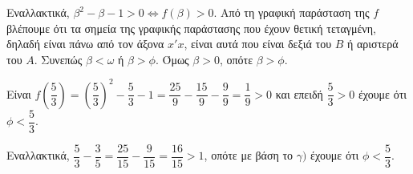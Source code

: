 \begin{alist}
Εναλλακτικά, $\beta^2 - \beta - 1 > 0 \Leftrightarrow f(\beta) > 0$. Από τη γραφική παράσταση της $f$
βλέπουμε ότι τα σημεία της γραφικής παράστασης που έχουν θετική τεταγμένη,
δηλαδή είναι πάνω από τον άξονα $x'x$, είναι αυτά που είναι δεξιά του $B$ ή αριστερά
του $A$. Συνεπώς $\beta < \omega$ ή $\beta > \phi$. Όμως $\beta > 0$, οπότε $\beta > \phi$.

\item Είναι $f\left(\dfrac{5}{3}\right) = \left(\dfrac{5}{3}\right)^2 - \dfrac{5}{3} - 1 = \dfrac{25}{9} - \dfrac{15}{9} - \dfrac{9}{9} = \dfrac{1}{9} > 0$ και επειδή $\dfrac{5}{3} > 0$ έχουμε ότι $\phi < \dfrac{5}{3}$.

Εναλλακτικά, $\dfrac{5}{3} - \dfrac{3}{5} = \dfrac{25}{15} - \dfrac{9}{15} = \dfrac{16}{15} > 1$, οπότε με βάση το $\gamma)$ έχουμε ότι $\phi < \dfrac{5}{3}$.
\end{alist}

